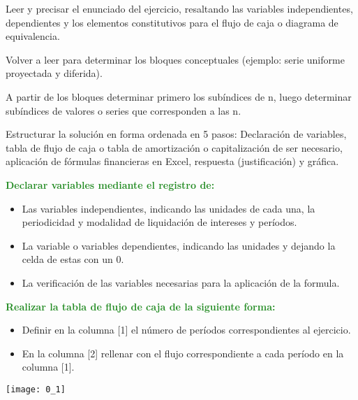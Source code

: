 \begin{enumerate}
	\item Leer y precisar el enunciado del ejercicio, resaltando las variables independientes, dependientes y los elementos constitutivos para el flujo de caja o diagrama de equivalencia.
	\item Volver a leer para determinar los bloques conceptuales (ejemplo: serie uniforme proyectada y diferida).
	\item A partir de los bloques determinar primero los subíndices de n, luego determinar subíndices de valores o series que corresponden a las n.
	\item Estructurar la solución en forma ordenada en 5 pasos: Declaración de variables, tabla de flujo de caja o tabla de amortización o capitalización de ser necesario, aplicación de fórmulas financieras en Excel, respuesta (justificación) y gráfica.
	      \textcolor{ForestGreen}{\item \textbf{Declarar variables mediante el registro de:}}
	      \begin{itemize}
		      \color{ForestGreen}
		      \item Las variables independientes, indicando las unidades de cada una, la periodicidad y modalidad de liquidación de intereses y períodos.
		      \item La variable o variables dependientes, indicando las unidades y dejando la celda de estas con un 0.
		      \item La verificación de las variables necesarias para la aplicación de la formula.
	      \end{itemize}
	      \textcolor{ForestGreen}{\item \textbf{Realizar la tabla de flujo de caja de la siguiente forma:}}
	      \begin{itemize}
		      \color{ForestGreen}
		      \item Definir en la columna [1] el número de períodos correspondientes al ejercicio.
		      \item En la columna [2] rellenar con el flujo correspondiente a cada período en la columna [1].
	      \end{itemize}
	      \begin{center}
		      \texttt{[image: 0\_1]}
	      \end{center}
	      

\end{enumerate}
